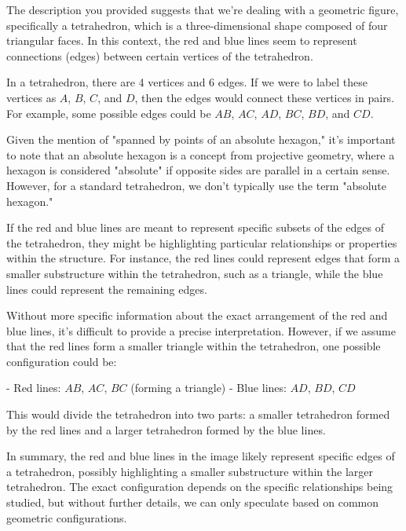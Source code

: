 The description you provided suggests that we're dealing with a geometric figure, specifically a tetrahedron, which is a three-dimensional shape composed of four triangular faces. In this context, the red and blue lines seem to represent connections (edges) between certain vertices of the tetrahedron.

In a tetrahedron, there are 4 vertices and 6 edges. If we were to label these vertices as \(A\), \(B\), \(C\), and \(D\), then the edges would connect these vertices in pairs. For example, some possible edges could be \(AB\), \(AC\), \(AD\), \(BC\), \(BD\), and \(CD\).

Given the mention of "spanned by points of an absolute hexagon," it's important to note that an absolute hexagon is a concept from projective geometry, where a hexagon is considered "absolute" if opposite sides are parallel in a certain sense. However, for a standard tetrahedron, we don't typically use the term "absolute hexagon."

If the red and blue lines are meant to represent specific subsets of the edges of the tetrahedron, they might be highlighting particular relationships or properties within the structure. For instance, the red lines could represent edges that form a smaller substructure within the tetrahedron, such as a triangle, while the blue lines could represent the remaining edges.

Without more specific information about the exact arrangement of the red and blue lines, it's difficult to provide a precise interpretation. However, if we assume that the red lines form a smaller triangle within the tetrahedron, one possible configuration could be:

- Red lines: \(AB\), \(AC\), \(BC\) (forming a triangle)
- Blue lines: \(AD\), \(BD\), \(CD\)

This would divide the tetrahedron into two parts: a smaller tetrahedron formed by the red lines and a larger tetrahedron formed by the blue lines.

In summary, the red and blue lines in the image likely represent specific edges of a tetrahedron, possibly highlighting a smaller substructure within the larger tetrahedron. The exact configuration depends on the specific relationships being studied, but without further details, we can only speculate based on common geometric configurations.